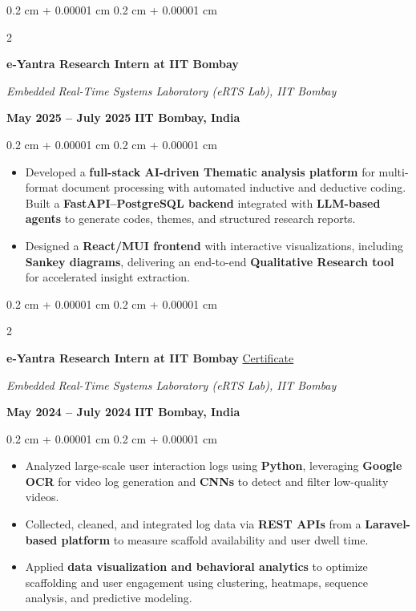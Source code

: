 \documentclass[10pt, letterpaper]{article}
\newenvironment{highlights}{
    \begin{itemize}[
        topsep=0.05 cm,
        parsep=0 cm,
        partopsep=0pt,
        itemsep=0pt,
        leftmargin=0.4 cm + 10pt
    ]
}{
    \end{itemize}
} %
\newenvironment{onecolentry}{
    \begin{adjustwidth}{
        0.2 cm + 0.00001 cm
    }{
        0.2 cm + 0.00001 cm
    }
}{
    \end{adjustwidth}
} %
\newenvironment{twocolentry}[2][]{
    \onecolentry
    \def\secondColumn{#2}
    \setcolumnwidth{\fill, 5.0 cm}
    \begin{paracol}{2}
}{
    \switchcolumn \raggedleft \secondColumn
    \end{paracol}
    \endonecolentry
} %
\begin{document}
        
        \vspace{0.1 cm}

        \begin{twocolentry}{
         \textbf{May 2025 – July 2025}
        \textbf{IIT Bombay, India}    
            
       }
    \textbf{e-Yantra Research Intern at IIT Bombay} 
            
            \textit{Embedded Real-Time Systems Laboratory (eRTS Lab), IIT Bombay}
        \end{twocolentry}

        \vspace{0.10 cm}
        \begin{onecolentry}
    \begin{highlights}
        \item Developed a \textbf{full-stack AI-driven Thematic analysis platform} for multi-format document processing with automated inductive and deductive coding. Built a \textbf{FastAPI--PostgreSQL backend} integrated with \textbf{LLM-based agents} to generate codes, themes, and structured research reports.
        \item Designed a \textbf{React/MUI frontend} with interactive visualizations, including \textbf{Sankey diagrams}, delivering an end-to-end \textbf{Qualitative Research tool }for accelerated insight extraction.
    \end{highlights}
\end{onecolentry}


         \vspace{0.1 cm}
       
        \begin{twocolentry}{
        \textbf{May 2024 – July 2024}
        \textbf{IIT Bombay, India}    
            }
    \textbf{e-Yantra Research Intern at IIT Bombay} \hspace{0 em} \href{https://drive.google.com/file/d/1ynuYG4gYFt-YiOApBXfypSoxRymzO6dS/view?usp=sharing}{Certificate}
            
            \textit{Embedded Real-Time Systems Laboratory (eRTS Lab), IIT Bombay}
        \end{twocolentry}

        \vspace{0.10 cm}
        \begin{onecolentry}
    \begin{highlights}
        \item Analyzed large-scale user interaction logs using \textbf{Python}, leveraging \textbf{Google OCR} for video log generation and \textbf{CNNs} to detect and filter low-quality videos.
        \item Collected, cleaned, and integrated log data via \textbf{REST APIs} from a \textbf{Laravel-based platform} to measure scaffold availability and user dwell time.
        \item Applied \textbf{data visualization and behavioral analytics} to optimize scaffolding and user engagement using clustering, heatmaps, sequence analysis, and predictive modeling.
    \end{highlights}
\end{onecolentry}
\end{document}
